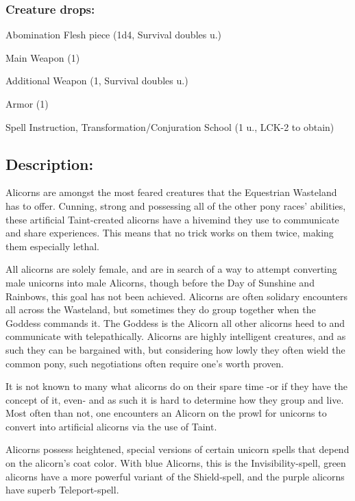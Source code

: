 \documentclass[11pt,a4paper,twocolumn]{book}
\begin{document}
	\subsubsection*{Creature drops:}
	\begin{compactitem}
		\item Abomination Flesh piece (1d4, Survival doubles u.)
		\item Main Weapon (1)
		\item Additional Weapon (1, Survival doubles u.)
		\item Armor (1)
		\item Spell Instruction, Transformation/Conjuration School (1 u., LCK-2 to obtain)
	\end{compactitem}
	
	\vfill
	
	\subsection*{Description:}	
	Alicorns are amongst the most feared creatures that the Equestrian Wasteland has to offer. Cunning, strong and possessing all of the other pony races' abilities, these artificial Taint-created alicorns have a hivemind they use to communicate and share experiences. This means that no trick works on them twice, making them especially lethal. 
	
	All alicorns are solely female, and are in search of a way to attempt converting male unicorns into male Alicorns, though before the Day of Sunshine and Rainbows, this goal has not been achieved.
	Alicorns are often solidary encounters all across the Wasteland, but sometimes they do group together when the Goddess commands it.
	The Goddess is the Alicorn all other alicorns heed to and communicate with telepathically.
	Alicorns are highly intelligent creatures, and as such they can be bargained with, but considering how lowly they often wield the common pony, such negotiations often require one's worth proven.
	
	It is not known to many what alicorns do on their spare time -or if they have the concept of it, even- and as such it is hard to determine how they group and live. Most often than not, one encounters an Alicorn on the prowl for unicorns to convert into artificial alicorns via the use of Taint.
	
	Alicorns possess heightened, special versions of certain unicorn spells that depend on the alicorn's coat color. With blue Alicorns, this is the Invisibility-spell, green alicorns have a more powerful variant of the Shield-spell, and the purple alicorns have superb Teleport-spell.
	
\end{document}
